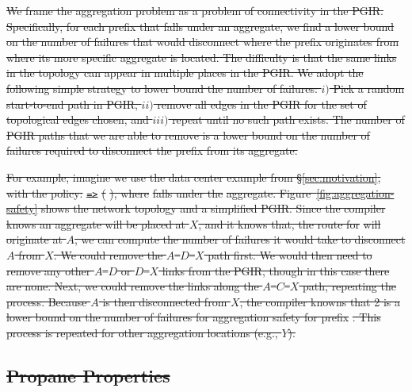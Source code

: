 \documentclass{sig-alternate-10pt}
\newcommand{\sysname}{{\small \sf Propane}\xspace}
\newcommand{\CD}[1]{\texttt{\small #1}}  %
\newcommand{\KW}[1]{\texttt{\small\bfseries{#1}}}
\newcommand{\Path}{\texttt{=>}}
\newcommand{\End}{\KW{end}}
\providecommand{\DIFdel}[1]{{\protect\color{red}\sout{#1}}}                      %
\providecommand{\DIFdelbegin}{} %
\providecommand{\DIFdelend}{} %
\begin{document}
\DIFdel{We frame the aggregation problem as a problem of connectivity in the PGIR. Specifically, for each prefix that falls under an aggregate, we find a lower bound on the number of failures that would disconnect where the prefix originates from where its more specific aggregate is located. The difficulty is that the same links in the topology can appear in multiple places in the PGIR. We adopt the following simple strategy to lower bound the number of failures: $i)$ Pick a random start-to-end path in PGIR, $ii)$ remove all edges in the PGIR for the set of topological edges chosen, and $iii)$ repeat until no such path exists.
The number of PGIR paths that we are able to remove is a lower bound on the number of failures required to disconnect the prefix from its aggregate. 
}%

\DIFdel{For example, imagine we use the data center example from \S\ref{sec:motivation}, with the policy: 
}%
\DIFdel{\Path \text{ }}%
\DIFdel{(}%
\DIFdel{), where }%
\DIFdel{falls under the }%
\DIFdel{aggregate. Figure~\ref{fig:aggregation-safety} shows the network topology and a simplified PGIR. Since the compiler knows an aggregate will be placed at $X$, and it knows that, the route for }%
\DIFdel{will originate at $A$, we can compute the number of failures it would take to disconnect $A$ from $X$. We could remove the $A$--$D$--$X$ path first. We would then need to remove any other $A$--$D$ or $D$--$X$ links from the PGIR, though in this case there are none. Next, we could remove the links along the $A$--$C$--$X$ path, repeating the process. Because $A$ is then disconnected from $X$, the compiler knowns that 2 is a lower bound on the number of failures for aggregation safety for prefix }%
\DIFdel{. This process is repeated for other aggregation locations (e.g., $Y$).
}%

\subsection{\DIFdel{Propane Properties}}
\addtocounter{subsection}{-1}%


\DIFdelend %
\DIFdelbegin %
\end{document}
